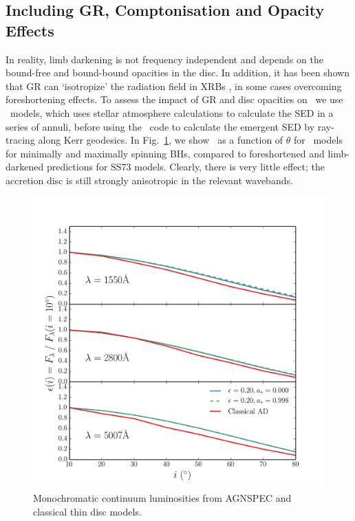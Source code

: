 \subsection{Including GR, Comptonisation and Opacity Effects}

\noindent
In reality, limb darkening is not frequency independent and 
depends on the bound-free and bound-bound opacities in the disc.
In addition, it has been shown that GR can `isotropize' the radiation
field in XRBs \citep{zhang1997,munozdarias2013}, in some cases overcoming
foreshortening effects. To assess the impact of GR and disc opacities
on \ept\ we use \agn\ models, which uses stellar atmosphere calculations to calculate the 
SED in a series of annuli, before using the \kerrtrans\ code 
to calculate the emergent SED by ray-tracing along Kerr geodesics.
In Fig.~\ref{fig:agnspec_disc}, we show \ept\ as a function of 
$\theta$ for \agn\ models for minimally and maximally spinning BHs,
compared to foreshortened and limb-darkened predictions for SS73 models.
Clearly, there is very little effect; 
the accretion disc is still strongly anisotropic in the relevant wavebands.

\begin{figure}
\centering
\includegraphics[width=1.0\textwidth]{figures/ewpaper/agnspec.png}
\caption
{
Monochromatic continuum luminosities from AGNSPEC and classical thin disc
models.
}
\label{fig:agnspec_disc}
\end{figure} 

